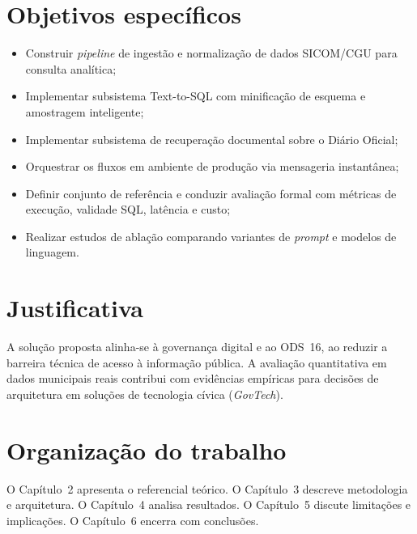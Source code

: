 \section{Objetivos específicos}

\begin{itemize}
    \item Construir \textit{pipeline} de ingestão e normalização de dados SICOM/CGU para consulta analítica;
    \item Implementar subsistema Text-to-SQL com minificação de esquema e amostragem inteligente;
    \item Implementar subsistema de recuperação documental sobre o Diário Oficial;
    \item Orquestrar os fluxos em ambiente de produção via mensageria instantânea;
    \item Definir conjunto de referência e conduzir avaliação formal com métricas de execução, validade SQL, latência e custo;
    \item Realizar estudos de ablação comparando variantes de \textit{prompt} e modelos de linguagem.
\end{itemize}

\section{Justificativa}

A solução proposta alinha-se à governança digital e ao ODS~16, ao reduzir a barreira técnica de acesso à informação pública. A avaliação quantitativa em dados municipais reais contribui com evidências empíricas para decisões de arquitetura em soluções de tecnologia cívica (\textit{GovTech}).

\section{Organização do trabalho}

O Capítulo~2 apresenta o referencial teórico. O Capítulo~3 descreve metodologia e arquitetura. O Capítulo~4 analisa resultados. O Capítulo~5 discute limitações e implicações. O Capítulo~6 encerra com conclusões.
